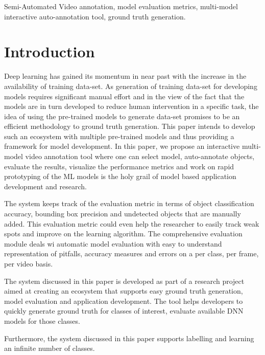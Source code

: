 \documentclass[conference]{IEEEtran}
\begin{document}
\begin{IEEEkeywords}
Semi-Automated Video annotation, model evaluation metrics, multi-model interactive auto-annotation tool, ground truth generation.
\end{IEEEkeywords}

%
\IEEEpeerreviewmaketitle


\section{Introduction}
Deep learning has gained its momentum in near past with the increase in the availability of training data-set. As generation of training data-set for developing models requires significant manual effort and in the view of the fact that the models are in turn developed to reduce human intervention in a specific task, the idea of using the pre-trained models to generate data-set promises to be an efficient methodology to ground truth generation. This paper intends to develop such an ecosystem with multiple pre-trained models and thus providing a framework for model development. In this paper, we propose an interactive multi-model video annotation tool where one can select model, auto-annotate objects, evaluate the results, visualize the performance metrics and work on rapid prototyping of the ML models is the holy grail of model based application development and research.\par
The system keeps track of the evaluation metric in terms of object classification accuracy, bounding box precision and undetected objects that are manually added. This evaluation metric could even help the researcher to easily track weak spots and improve on the learning algorithm. The comprehensive evaluation module deals wi automatic model evaluation with easy to understand representation of pitfalls, accuracy measures and errors on a per class, per frame, per video basis. \par
The system discussed in this paper is developed as part of a research project aimed at creating an ecosystem that supports easy ground truth generation, model evaluation and application development. The tool helps developers to quickly generate ground truth for classes of interest, evaluate available DNN models for those classes. \par
Furthermore, the system discussed in this paper supports labelling and learning an infinite number of classes.  
\end{document}
